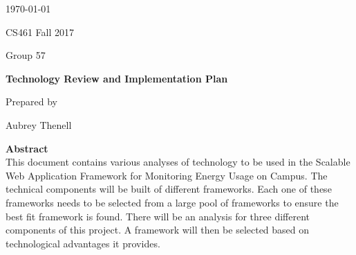 \documentclass[onecolumn, draftclsnofoot,10pt, compsoc]{IEEEtran}
\newcommand{\NameSigPair}[1]{\par
\makebox[2.75in][r]{#1} \hfil 	\makebox[3.25in]{\makebox[2.25in]{\hrulefill} \hfill		\makebox[.75in]{\hrulefill}}
\par\vspace{-12pt} \textit{\tiny\noindent
\makebox[2.75in]{} \hfil		\makebox[3.25in]{\makebox[2.25in][r]{Signature} \hfill	\makebox[.75in][r]{Date}}}}
\renewcommand{\NameSigPair}[1]{#1}
\begin{document}
\begin{titlepage}
    \begin{singlespace}
        \hfill 
        \par\vspace{.2in}
        \centering
        \scshape{
            {\large\today}\par
			{\large CS461 Fall 2017}\par
			{\large Group 57}\par
            \vspace{2.5in}
            \textbf{\Huge{Technology Review and Implementation Plan}}\par
	
            \vspace{2.5in}
            {\large Prepared by }\par
            \vspace{5pt}
            {\Large
                \NameSigPair{Aubrey Thenell}\par
			\vfill
			\textbf{Abstract} \\
            \indent 
				This document contains various analyses of technology to be used in the Scalable Web Application Framework for Monitoring Energy Usage on Campus. The technical components will be built of different frameworks. Each one of these frameworks needs to be selected from a large pool of frameworks to ensure the best fit framework is found. There will be an analysis for three different components of this project. A framework will then be selected based on technological advantages it provides.
            }
            \vspace{20pt}
        }
      
    \end{singlespace}
\end{titlepage}
\newpage
{}
\tableofcontents
\clearpage
\end{document}
